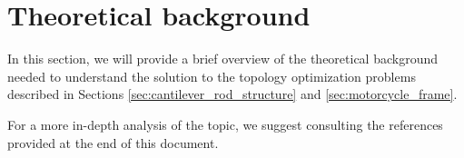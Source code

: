 \section{Theoretical background}
\label{sec:theoretical_background}

In this section, we will provide a brief overview of the theoretical background needed to understand the solution to the topology optimization problems described in Sections \ref{sec:cantilever_rod_structure} and \ref{sec:motorcycle_frame}.

For a more in-depth analysis of the topic, we suggest consulting the references provided at the end of this document.



